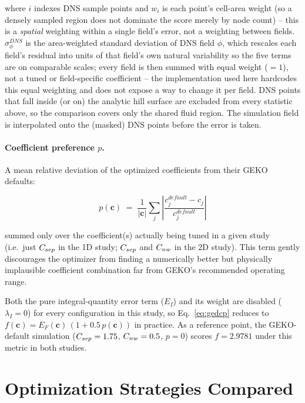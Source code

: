 where $i$ indexes DNS sample points and $w_i$ is each point's cell-area weight
(so a densely sampled region does not dominate the score merely by node
count) -- this is a \emph{spatial} weighting within a single field's error,
not a weighting between fields. $\sigma^{DNS}_\phi$ is the area-weighted
standard deviation of DNS field $\phi$, which rescales each field's residual
into units of that field's own natural variability so the five terms are on
comparable scales; every field is then summed with equal weight ($=1$), not a
tuned or field-specific coefficient -- the implementation used here hardcodes
this equal weighting and does not expose a way to change it per field.
DNS points that fall inside (or on) the analytic hill surface are excluded
from every statistic above, so the comparison covers only the shared fluid
region. The simulation field is interpolated onto the (masked) DNS points
before the error is taken.

\paragraph{Coefficient preference $p$.} A mean relative deviation of the
optimized coefficients from their GEKO defaults:

\begin{equation}
p(\mathbf{c}) \;=\; \frac{1}{|\mathbf{c}|} \sum_{j} \left| \frac{c_j^{default} - c_j}{c_j^{default}} \right|
\label{eq:pref}
\end{equation}

summed only over the coefficient(s) actually being tuned in a given study (i.e.\
just $C_{sep}$ in the 1D study; $C_{sep}$ and $C_{nw}$ in the 2D study). This term
gently discourages the optimizer from finding a numerically better but physically
implausible coefficient combination far from GEKO's recommended operating range.

Both the pure integral-quantity error term ($E_I$) and its weight are disabled
($\lambda_I = 0$) for every configuration in this study, so Eq.~\eqref{eq:gedcp}
reduces to $f(\mathbf{c}) = E_F(\mathbf{c})\,(1 + 0.5\,p(\mathbf{c}))$ in practice.
As a reference point, the GEKO-default simulation ($C_{sep}=1.75$, $C_{nw}=0.5$,
$p=0$) scores $f = 2.9781$ under this metric in both studies.

\section{Optimization Strategies Compared}
\label{sec:strategies}

